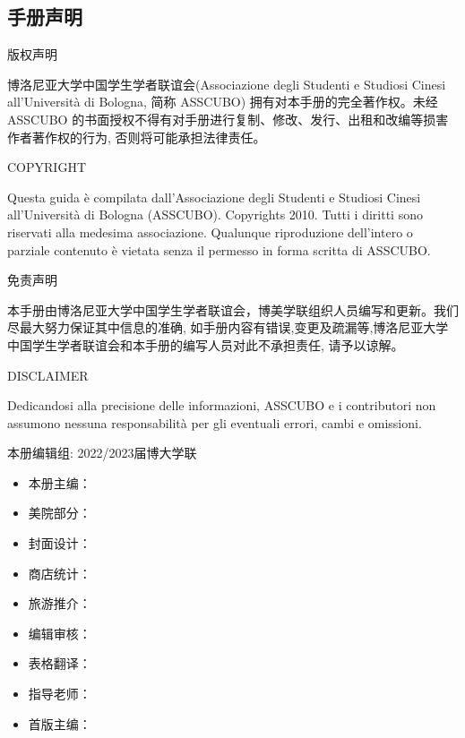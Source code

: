 \begin{titlepage}
\newpage

\topmargin=-2cm                        %

\chapter*{手册声明}                 %
\pagestyle{empty}%
\thispagestyle{empty} 

\vspace{0.5cm}\centerline{\Large 版权声明}
博洛尼亚大学中国学生学者联谊会(Associazione degli Studenti e Studiosi 
Cinesi all’Università di Bologna, 简称 ASSCUBO) 拥有对本手册的完全著作权。未经 ASSCUBO 的书面授权不得有对手册进行复制、修改、发行、出租和改编等损害作者著作权的行为, 否则将可能承担法律责任。 

\vspace{0.5cm}\centerline{\Large COPYRIGHT}
Questa guida è compilata dall’Associazione degli Studenti e Studiosi Cinesi all’Università di Bologna (ASSCUBO). Copyrights 2010. Tutti i diritti sono riservati alla medesima associazione. Qualunque riproduzione dell’intero o parziale contenuto è vietata senza il permesso in forma scritta di ASSCUBO. 

\vspace{0.5cm}\centerline{\Large 免责声明}
本手册由博洛尼亚大学中国学生学者联谊会，博美学联组织人员编写和更新。我们尽最大努力保证其中信息的准确, 如手册内容有错误,变更及疏漏等,博洛尼亚大学中国学生学者联谊会和本手册的编写人员对此不承担责任, 请予以谅解。 

\vspace{0.5cm}\centerline{\Large DISCLAIMER}
Dedicandosi alla precisione delle informazioni, ASSCUBO e i contributori non assumono nessuna responsabilità per gli eventuali errori, cambi e omissioni. 

\newpage

\topmargin=0cm 

\vspace{3cm}\centerline{\Large 本册编辑组: 2022/2023届博大学联} 

\begin{itemize}
\item[] 本册主编：
\item[] 美院部分：
\item[] 封面设计：
\item[] 商店统计：
\item[] 旅游推介：
\item[] 编辑审核：
\item[] 表格翻译：
\item[] 指导老师：
\item[] 首版主编：
\end{itemize}


\clearpage{\pagestyle{empty}\cleardoublepage}%
\end{titlepage}

